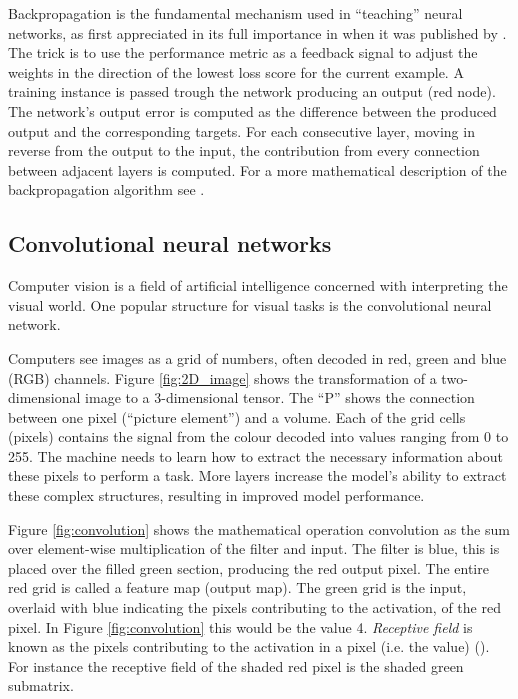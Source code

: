 Backpropagation is the fundamental mechanism used in ``teaching'' neural networks, as first appreciated in its full importance in \citeyear{RumelhartBackProp} when it was published by \citeauthor{RumelhartBackProp}. The trick is to use the performance metric as a feedback signal to adjust the weights in the direction of the lowest loss score for the current example. A training instance is passed trough the network producing an output (red node). The network's output error is computed as the difference between the produced output and the corresponding targets. For each consecutive layer, moving in reverse from the output to the input, the contribution from every connection between adjacent layers is computed.
For a more mathematical description of the backpropagation algorithm see .

\subsection{Convolutional neural networks} \label{sec:convolutional neural network}
Computer vision is a field of artificial intelligence concerned with interpreting the visual world. One popular structure for visual tasks is the convolutional neural network. %

Computers see images as a grid of numbers, often decoded in red, green and blue (RGB) channels. Figure \ref{fig:2D_image} shows the transformation of a two-dimensional image to a 3-dimensional tensor. The ``P'' shows the connection between one pixel (``picture element'') and a volume. Each of the grid cells (pixels) contains the signal from the colour decoded into values ranging from 0 to 255. The machine needs to learn how to extract the necessary information about these pixels to perform a task. More layers increase the model's ability to extract these complex structures, resulting in improved model performance. 

Figure \ref{fig:convolution} shows the mathematical operation convolution as the sum over element-wise multiplication of the filter and input. The filter is blue, this is placed over the filled green section, producing the red output pixel. The entire red grid is called a feature map (output map). The green grid is the input, overlaid with blue indicating the pixels contributing to the activation, of the red pixel. In Figure \ref{fig:convolution} this would be the value 4. \textit{Receptive field} is known as the pixels contributing to the activation in a pixel (i.e. the value) (\cite{Luo2016UnderstandingNetworks}). For instance the receptive field of the shaded red pixel is the shaded green submatrix.

